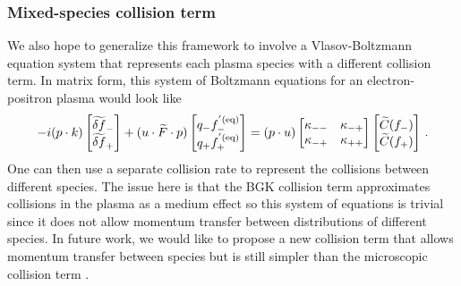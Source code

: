 \subsubsection{Mixed-species collision term}
We also hope to generalize this framework to involve a Vlasov-Boltzmann equation system that represents each plasma species with a different collision term. In matrix form, this system of Boltzmann equations for an electron-positron plasma would look like
\begin{equation}\label{eq:vectoreq}
-i (p \cdot k) \left[\begin{matrix}
\widetilde{\delta f}_- \\ \widetilde{\delta f}_+ 
\end{matrix}\right] + (u \cdot \widetilde{F} \cdot p)\left[\begin{matrix}
q_-f^{'(\mathrm{eq})}_- \\ q_+f^{'(\mathrm{eq})}_+
\end{matrix}\right] = (p \cdot u) \left[\begin{matrix}
\kappa_{--} & \kappa_{-+}\\
\kappa_{-+} & \kappa_{++}
\end{matrix}\right]\left[\begin{matrix}
\widetilde{C}(f_-) \\ \widetilde{C}(f_+)
\end{matrix} \right]\,.
\end{equation}
One can then use a separate collision rate to represent the collisions between different species. The issue here is that the BGK collision term approximates collisions in the plasma as a medium effect so this system of equations is trivial since it does not allow momentum transfer between distributions of different species. In future work, we would like to propose a new collision term that allows momentum transfer between species but is still simpler than the microscopic collision term .








